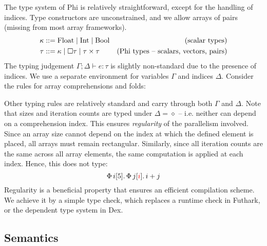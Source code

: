 The type system of Phi is relatively straightforward, except for the handling of indices. Type constructors are unconstrained, and we allow arrays of pairs (missing from most array frameworks).
\begin{align*}
\kappa &::= \phifloattype \mid \phiinttype \mid \phibooltype & \text{(scalar types)} \\
\tau &::= \kappa \mid \phivectype{\tau} \mid \phipairtype{\tau}{\tau} & \text{(Phi types -- scalars, vectors, pairs)}
\end{align*}
The typing judgement $\Gamma; \Delta \vdash e : \tau$ is slightly non-standard due to the presence of indices. We use a separate environment for variables $\Gamma$ and indices $\Delta$. Consider the rules for array comprehensions and folds:
\begin{center}
    \begin{prooftree}[center=false]
    \end{prooftree} \quad
    \begin{prooftree}[center=false]
    \end{prooftree}
\end{center}
Other typing rules are relatively standard and carry through both $\Gamma$ and $\Delta$. Note that sizes and iteration counts are typed under $\Delta = \diamond$ -- i.e. neither can depend on a comprehension index. This ensures \textit{regularity} of the parallelism involved. Since an array size cannot depend on the index at which the defined element is placed, all arrays must remain rectangular. Similarly, since all iteration counts are the same across all array elements, the same computation is applied at each index. Hence, this does not type:
$$ \phivec{i}{5}{\phivec{j}{\textcolor{red}{i}}{i + j}} $$
Regularity is a beneficial property that ensures an efficient compilation scheme. We achieve it by a simple type check, which replaces a runtime check in Futhark, or the dependent type system in Dex. 

\subsection{Semantics}


